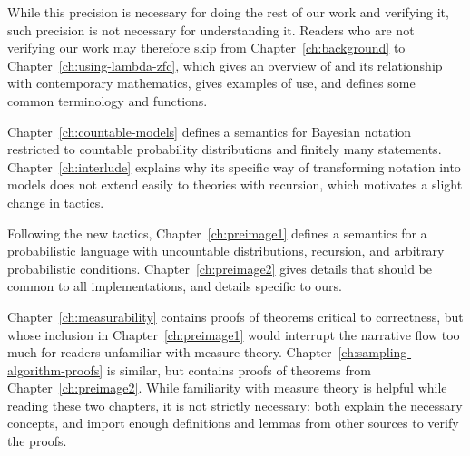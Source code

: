 While this precision is necessary for doing the rest of our work and verifying it, such precision is not necessary for understanding it.
Readers who are not verifying our work may therefore skip from Chapter~\ref{ch:background} to Chapter~\ref{ch:using-lambda-zfc}, which gives an overview of \lzfclang and its relationship with contemporary mathematics, gives examples of use, and defines some common terminology and functions.

Chapter~\ref{ch:countable-models} defines a semantics for Bayesian notation restricted to countable probability distributions and finitely many statements.
Chapter~\ref{ch:interlude} explains why its specific way of transforming notation into models does not extend easily to theories with recursion, which motivates a slight change in tactics.

Following the new tactics, Chapter~\ref{ch:preimage1} defines a semantics for a probabilistic language with uncountable distributions, recursion, and arbitrary probabilistic conditions.
Chapter~\ref{ch:preimage2} gives details that should be common to all implementations, and details specific to ours.

Chapter~\ref{ch:measurability} contains proofs of theorems critical to correctness, but whose inclusion in Chapter~\ref{ch:preimage1} would interrupt the narrative flow too much for readers unfamiliar with measure theory.
Chapter~\ref{ch:sampling-algorithm-proofs} is similar, but contains proofs of theorems from Chapter~\ref{ch:preimage2}.
While familiarity with measure theory is helpful while reading these two chapters, it is not strictly necessary: both explain the necessary concepts, and import enough definitions and lemmas from other sources to verify the proofs.
